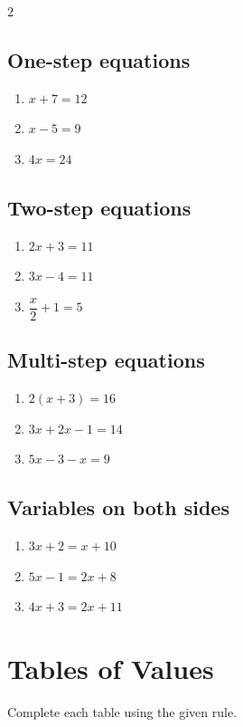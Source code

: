 \documentclass[11pt]{article}
\newcommand{\ans}{\hrulefill}
\begin{document}
\begin{multicols}{2}
\subsection*{One-step equations}
\begin{enumerate}
  \item $x + 7 = 12$ \ans
  \item $x - 5 = 9$ \ans
  \item $4x = 24$ \ans
\end{enumerate}

\subsection*{Two-step equations}
\begin{enumerate}[resume]
  \item $2x + 3 = 11$ \ans
  \item $3x - 4 = 11$ \ans
  \item $\dfrac{x}{2} + 1 = 5$ \ans
\end{enumerate}

\subsection*{Multi-step equations}
\begin{enumerate}[resume]
  \item $2(x + 3) = 16$ \ans
  \item $3x + 2x - 1 = 14$ \ans
  \item $5x - 3 - x = 9$ \ans
\end{enumerate}

\subsection*{Variables on both sides}
\begin{enumerate}[resume]
  \item $3x + 2 = x + 10$ \ans
  \item $5x - 1 = 2x + 8$ \ans
  \item $4x + 3 = 2x + 11$ \ans
\end{enumerate}
\end{multicols}

\newpage
\section{Tables of Values}
\noindent Complete each table using the given rule.
\end{document}
